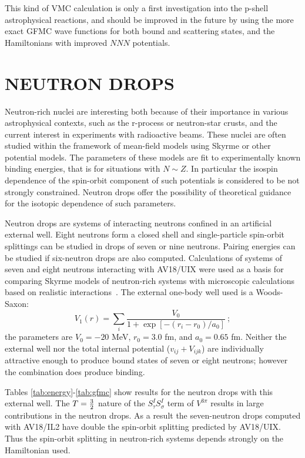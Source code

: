 This kind of VMC calculation is only a first investigation into the p-shell
astrophysical reactions, and should be improved in the future by using the
more exact GFMC wave functions for both bound and scattering states, and
the Hamiltonians with improved $N\!N\!N$ potentials.

\section{NEUTRON DROPS}

Neutron-rich nuclei are interesting both because of
their importance in various astrophysical contexts, such as
the r-process or neutron-star crusts, and the current 
interest in experiments with radioactive beams.  These nuclei are
often studied within the framework of mean-field models using
Skyrme or other potential models.  The parameters of these models
are fit to experimentally known binding energies, that is for
situations with $N{\sim}Z$.  In particular the 
isospin dependence of the spin-orbit component
of such potentials is considered to be not strongly constrained.
Neutron drops offer the possibility of theoretical guidance
for the isotopic dependence of such parameters.

Neutron drops are systems of interacting neutrons confined in an
artificial external well.  Eight neutrons form a closed shell
and single-particle spin-orbit splittings can be studied in
drops of seven or nine neutrons.  Pairing energies can be studied
if six-neutron drops are also computed.
Calculations of systems of seven and eight neutrons interacting with 
AV18/UIX were used as a basis for comparing Skyrme
models of neutron-rich systems with microscopic calculations based on
realistic interactions~\cite{PSCPPR96}.  
The external one-body well used is a Woods-Saxon:
\begin{equation}
V_1 (r) = \sum_i \frac{V_0}{1 + \exp [ - (r_i - r_0)/a_0 ]} \ ;
\end{equation}
the parameters are $V_0 = -20$ MeV, $r_0 = 3.0$ fm, and $a_0 = 0.65$ fm.
Neither the external well nor the total internal potential
($v_{ij}+V_{ijk}$) are individually attractive enough to produce bound
states of seven or eight neutrons; however the combination does produce
binding.

Tables \ref{tab:energy}-\ref{tab:gfmc} show results for the neutron drops
with this external well.  
The $T=\textstyle{3\over2}$ nature of the
$S^I_{\tau}S^I_{\sigma}$ term of $V^{3\pi}$ results in large contributions
in the neutron drops.  As a result the seven-neutron drops computed with
AV18/IL2 have double the spin-orbit splitting predicted by AV18/UIX.
Thus the spin-orbit splitting in neutron-rich systems depends strongly on
the Hamiltonian used.

